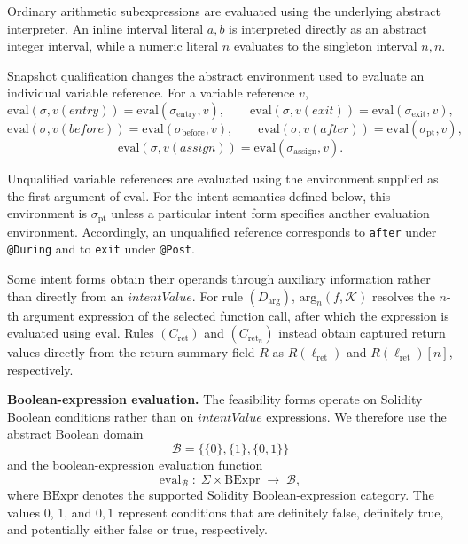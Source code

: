 \documentclass[11pt,oneside]{report}
\theoremstyle{plain}
\theoremstyle{definition}
\theoremstyle{remark}
\begin{document}
Ordinary arithmetic subexpressions are evaluated using the underlying abstract
interpreter.
An inline interval literal $a,b$ is interpreted directly as an abstract
integer interval, while a numeric literal $n$ evaluates to the singleton
interval $n,n$.

Snapshot qualification changes the abstract environment used to evaluate an
individual variable reference.
For a variable reference $v$,
\[
\mathrm{eval}(\sigma, v(\mathit{entry}))
=
\mathrm{eval}(\sigma_{\mathrm{entry}},v),
\qquad
\mathrm{eval}(\sigma, v(\mathit{exit}))
=
\mathrm{eval}(\sigma_{\mathrm{exit}},v),
\]
\[
\mathrm{eval}(\sigma, v(\mathit{before}))
=
\mathrm{eval}(\sigma_{\mathrm{before}},v),
\qquad
\mathrm{eval}(\sigma, v(\mathit{after}))
=
\mathrm{eval}(\sigma_{\mathrm{pt}},v),
\]
\[
\mathrm{eval}(\sigma, v(\mathit{assign}))
=
\mathrm{eval}(\sigma_{\mathrm{assign}},v).
\]

Unqualified variable references are evaluated using the environment supplied
as the first argument of $\mathrm{eval}$.
For the intent semantics defined below, this environment is
$\sigma_{\mathrm{pt}}$ unless a particular intent form specifies another
evaluation environment.
Accordingly, an unqualified reference corresponds to \texttt{after} under
\texttt{@During} and to \texttt{exit} under \texttt{@Post}.

Some intent forms obtain their operands through auxiliary information rather
than directly from an $\mathit{intentValue}$.
For rule $(D_{\text{arg}})$,
$\mathrm{arg}_n(f,\mathcal{K})$ resolves the $n$-th argument expression of the
selected function call, after which the expression is evaluated using
$\mathrm{eval}$.
Rules $(C_{\text{ret}})$ and $(C_{\text{ret}_n})$ instead obtain captured
return values directly from the return-summary field $R$ as
$R(\ell_{\text{ret}})$ and $R(\ell_{\text{ret}})[n]$, respectively.

\smallskip
\noindent\textbf{Boolean-expression evaluation.} The feasibility forms operate on Solidity Boolean conditions rather than on
$\mathit{intentValue}$ expressions.
We therefore use the abstract Boolean domain
\[
\mathcal{B}
=
\bigl\{
\{0\},
\{1\},
\{0,1\}
\bigr\}
\]
and the boolean-expression evaluation function
\[
\mathrm{eval}_{\mathcal{B}}
\;:\;
\Sigma \times \mathrm{BExpr}
\;\to\;
\mathcal{B},
\]
where $\mathrm{BExpr}$ denotes the supported Solidity Boolean-expression
category.
The values ${0}$, ${1}$, and ${0,1}$ represent conditions that are
definitely false, definitely true, and potentially either false or true,
respectively.
\end{document}
